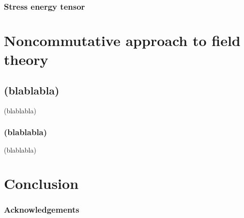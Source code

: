 \documentclass[10pt]{book}
\theoremstyle{break}
\begin{document}
\section{Stress energy tensor}


\part{Noncommutative approach to field theory}

\chapter{(blablabla)}

(blablabla)

\section{(blablabla)}

(blablabla)


\part*{Conclusion}



\newpage

\vspace*{100pt}

\thispagestyle{empty}

\section*{Acknowledgements}
\end{document}

